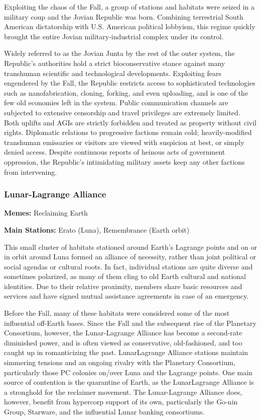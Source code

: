 Exploiting the chaos of the Fall, a group of stations and habitats were seized in a military coup and the Jovian Republic was born. Combining terrestrial South American dictatorship with U.S. American political lobbyism, this regime quickly brought the entire Jovian military-industrial complex under its control. 

Widely referred to as the Jovian Junta by the rest of the outer system, the Republic's authorities hold a strict bioconservative stance against many transhuman scientific and technological developments. Exploiting fears engendered by the Fall, the Republic restricts access to sophisticated technologies such as nanofabrication, cloning, forking, and even uploading, and is one of the few old economies left in the system. Public communication channels are subjected to extensive censorship and travel privileges are extremely limited. Both uplifts and AGIs are strictly forbidden and treated as property without civil rights. Diplomatic relations to progressive factions remain cold; heavily-modified transhuman emissaries or visitors are viewed with suspicion at best, or simply denied access. Despite continuous reports of heinous acts of government oppression, the Republic's intimidating military assets keep any other factions from intervening. 

\subsubsection{Lunar-Lagrange Alliance} \label{sec:lunar-lagr-alli} 

\textbf{Memes:} Reclaiming Earth 

\textbf{Main Stations:} Erato (Luna), Remembrance (Earth orbit) 

This small cluster of habitats stationed around Earth's Lagrange points and on or in orbit around Luna formed an alliance of necessity, rather than joint political or social agendas or cultural roots. In fact, individual stations are quite diverse and sometimes polarized, as many of them cling to old Earth cultural and national identities. Due to their relative proximity, members share basic resources and services and have signed mutual assistance agreements in case of an emergency. 

Before the Fall, many of these habitats were considered some of the most influential off-Earth bases. Since the Fall and the subsequent rise of the Planetary Consortium, however, the Lunar-Lagrange Alliance has become a second-rate diminished power, and is often viewed as conservative, old-fashioned, and too caught up in romanticizing the past. LunarLagrange Alliance stations maintain simmering tensions and an ongoing rivalry with the Planetary Consortium, particularly those PC colonies on/over Luna and the Lagrange points. One main source of contention is the quarantine of Earth, as the LunarLagrange Alliance is a stronghold for the reclaimer movement. The Lunar-Lagrange Alliance does, however, benefit from hypercorp support of its own, particularly the Go-nin Group, Starware, and the influential Lunar banking consortiums. 


